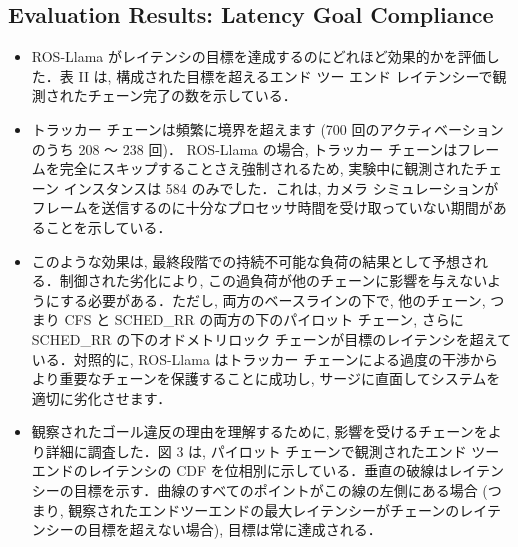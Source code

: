 \subsection{Evaluation Results: Latency Goal Compliance}
\label{ssec: evaluation results: latency goal compliance}

\begin{frame}{}
    \begin{itemize}
        \item ROS-Llama がレイテンシの目標を達成するのにどれほど効果的かを評価した．表 II は, 構成された目標を超えるエンド ツー エンド レイテンシーで観測されたチェーン完了の数を示している．
    \end{itemize}
\end{frame}

\begin{frame}{}
    \begin{itemize}
        \item トラッカー チェーンは頻繁に境界を超えます (700 回のアクティベーションのうち 208 ～ 238 回)． ROS-Llama の場合, トラッカー チェーンはフレームを完全にスキップすることさえ強制されるため, 実験中に観測されたチェーン インスタンスは 584 のみでした．これは, カメラ シミュレーションがフレームを送信するのに十分なプロセッサ時間を受け取っていない期間があることを示している．
    \end{itemize}
\end{frame}

\begin{frame}{}
    \begin{itemize}
        \item このような効果は, 最終段階での持続不可能な負荷の結果として予想される．制御された劣化により, この過負荷が他のチェーンに影響を与えないようにする必要がある．ただし, 両方のベースラインの下で, 他のチェーン, つまり CFS と SCHED\_RR の両方の下のパイロット チェーン, さらに SCHED\_RR の下のオドメトリロック チェーンが目標のレイテンシを超えている．対照的に, ROS-Llama はトラッカー チェーンによる過度の干渉からより重要なチェーンを保護することに成功し, サージに直面してシステムを適切に劣化させます．
    \end{itemize}
\end{frame}

\begin{frame}{}
    \begin{itemize}
        \item 観察されたゴール違反の理由を理解するために, 影響を受けるチェーンをより詳細に調査した．図 3 は, パイロット チェーンで観測されたエンド ツー エンドのレイテンシの CDF を位相別に示している．垂直の破線はレイテンシーの目標を示す．曲線のすべてのポイントがこの線の左側にある場合 (つまり, 観察されたエンドツーエンドの最大レイテンシーがチェーンのレイテンシーの目標を超えない場合), 目標は常に達成される．
    \end{itemize}
\end{frame}

